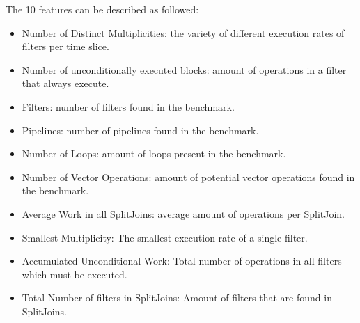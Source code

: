 \vspace{5em}
The 10 features can be described as followed:
\begin{itemize}
\item Number of Distinct Multiplicities: the variety of different execution rates of filters per time slice.
\item Number of unconditionally executed blocks: amount of operations in a filter that always execute.
\item Filters: number of filters found in the benchmark.
\item Pipelines: number of pipelines found in the benchmark.
\item Number of Loops: amount of loops present in the benchmark.
\item Number of Vector Operations: amount of potential vector operations found in the benchmark.
\item Average Work in all SplitJoins: average amount of operations per SplitJoin.
\item Smallest Multiplicity: The smallest execution rate of a single filter.
\item Accumulated Unconditional Work: Total number of operations in all filters which must be executed.
\item Total Number of filters in SplitJoins: Amount of filters that are found in SplitJoins.
\end{itemize}

